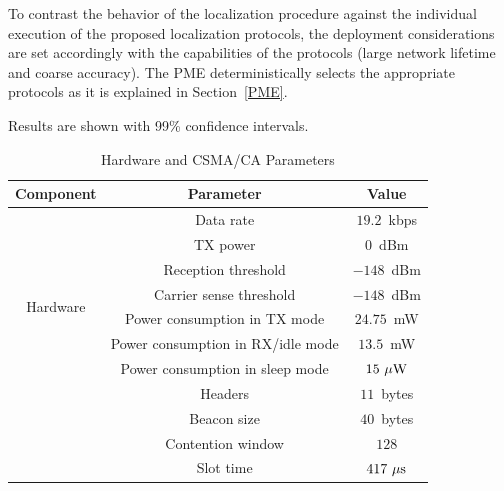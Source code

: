To contrast the behavior of the localization procedure against the individual execution of the proposed localization protocols, the deployment considerations are set accordingly with the capabilities of the protocols (large network lifetime and coarse accuracy). The PME deterministically selects the appropriate protocols as it is explained in Section~\ref{PME}.


Results are shown with 99\% confidence intervals.

\begin{table}[tb]
  \begin{threeparttable}[t]
    \caption{Hardware and CSMA/CA Parameters}
    \label{tab:MAC_param}
    \begin{tabular}{c||c||c}
    \hline
    \bfseries Component & \bfseries Parameter & \bfseries Value\\
    \hline\hline 
    \multirow{8}{*}{Hardware} & Data rate & $19.2$~kbps\\ %
			      & TX power & $0$~dBm\\ %
			      & Reception threshold & $-148$~dBm\\ %
			      & Carrier sense threshold & $-148$~dBm\\ %
			      & Power consumption in TX mode & $24.75$~mW\\ %
			      & Power consumption in RX/idle mode & $13.5$~mW\\ %
			      & Power consumption in sleep mode & $15~\mu\rm{W}$\\ %
    \hline
    \multirow{4}{*}{CSMA/CA} & Headers & $11$~bytes\\ %
			      & Beacon size & $40$~bytes\\ %
			      & Contention window & $128$\\ %
			      & Slot time & $417~\mu\rm{s}$\\ %
    \hline
    \end{tabular}
  \end{threeparttable}
\end{table}

